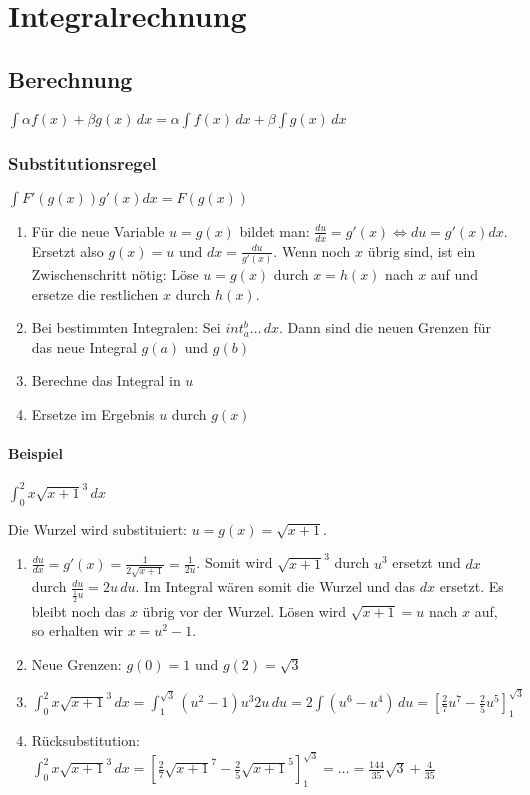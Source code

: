 \section{Integralrechnung}
\subsection{Berechnung}
$\int \alpha f(x) + \beta g(x)\,dx = \alpha \int f(x)\,dx + \beta \int g(x)\,dx$

\subsubsection{Substitutionsregel}
$\int F'(g(x)) g'(x)dx = F(g(x))$


\begin{enumerate}
	\item Für die neue Variable $u = g(x)$ bildet man: $\frac{du}{dx} = g'(x)
	\Leftrightarrow du = g'(x)dx$. Ersetzt also $g(x) = u$ und $dx =
	\frac{du}{g'(x)}$. Wenn noch $x$ übrig sind, ist ein Zwischenschritt nötig:
	Löse $u = g(x)$ durch $x = h(x)$ nach $x$ auf und ersetze die restlichen $x$
	durch $h(x)$.
	\item Bei bestimmten Integralen: Sei $int_a^b \ldots \,dx$. Dann sind die neuen
	Grenzen für das neue Integral $g(a)$ und $g(b)$
	\item Berechne das Integral in $u$
	\item Ersetze im Ergebnis $u$ durch $g(x)$
\end{enumerate}

\paragraph{Beispiel}
$\int_0^2 x \sqrt{x+1}^3 \,dx$

Die Wurzel wird substituiert: $u = g(x) = \sqrt{x+1}$.

\begin{enumerate}
	\item $\frac{du}{dx} = g'(x) = \frac{1}{2\sqrt{x+1}} = \frac{1}{2u}$. Somit
	wird $\sqrt{x+1}^3$ durch $u^3$ ersetzt und $dx$ durch
	$\frac{du}{\frac{1}{2}u} = 2u\,du$. Im Integral wären somit die Wurzel und das
	$dx$ ersetzt. Es bleibt noch das $x$ übrig vor der Wurzel. Lösen wird
	$\sqrt{x+1} = u$ nach $x$ auf, so erhalten wir $x = u^2 - 1$.
	\item Neue Grenzen: $g(0) = 1$ und $g(2) = \sqrt{3}$
	\item $\int_0^2 x \sqrt{x+1}^3 \,dx = \int_1^{\sqrt{3}} (u^2 - 1)u^3 2u \,du =
	2\int(u^6 -u^4) \,du = [\frac{2}{7}u^7 - \frac{2}{5}u^5]_{1}^{\sqrt{3}}$
	\item Rücksubstitution: $\int_0^2 x \sqrt{x+1}^3 \,dx =
	[\frac{2}{7}\sqrt{x+1}^7 - \frac{2}{5}\sqrt{x+1}^5]_{1}^{\sqrt{3}} = \ldots = \frac{144}{35}\sqrt{3} +
	\frac{4}{35}$
\end{enumerate}